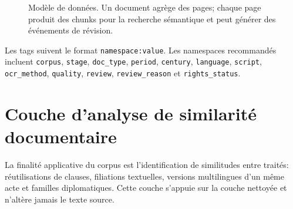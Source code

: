 \documentclass[11pt,a4paper]{article}
\begin{document}
\begin{figure}[H]
\centering
{}
\caption{Modèle de données. Un document agrège des pages; chaque page produit des chunks pour la recherche sémantique et peut générer des événements de révision.}
\label{fig:datamodel}
\end{figure}

Les tags suivent le format \texttt{namespace:value}. Les namespaces recommandés incluent \texttt{corpus}, \texttt{stage}, \texttt{doc\_type}, \texttt{period}, \texttt{century}, \texttt{language}, \texttt{script}, \texttt{ocr\_method}, \texttt{quality}, \texttt{review}, \texttt{review\_reason} et \texttt{rights\_status}.

\section{Couche d'analyse de similarité documentaire}

La finalité applicative du corpus est l'identification de similitudes entre traités: réutilisations de clauses, filiations textuelles, versions multilingues d'un même acte et familles diplomatiques. Cette couche s'appuie sur la couche nettoyée et n'altère jamais le texte source.
\end{document}
